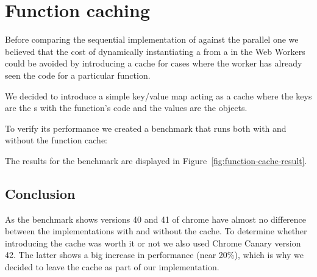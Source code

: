 \section{Function caching}\label{sec:func-caching}

Before comparing the sequential implementation of  against the parallel one we believed that the cost of dynamically instantiating a \tfunction{} from a \tstring{} in the Web Workers could be avoided by introducing a cache for cases where the worker has already seen the code for a particular function.

We decided to introduce a simple key/value map acting as a cache where the keys are the \tstring{}s with the function's code and the values are the \tfunction{} objects.

To verify its performance we created a benchmark that runs both with and without the function cache:

The results for the benchmark are displayed in Figure~\ref{fig:function-cache-result}.

\subsection{Conclusion}
As the benchmark shows versions 40 and 41 of chrome have almost no difference between the implementations with and without the cache. To determine whether introducing the cache was worth it or not we also used Chrome Canary version 42. The latter shows a big increase in performance (near 20\%), which is why we decided to leave the \tfunction{} cache as part of our implementation.

\pagebreak